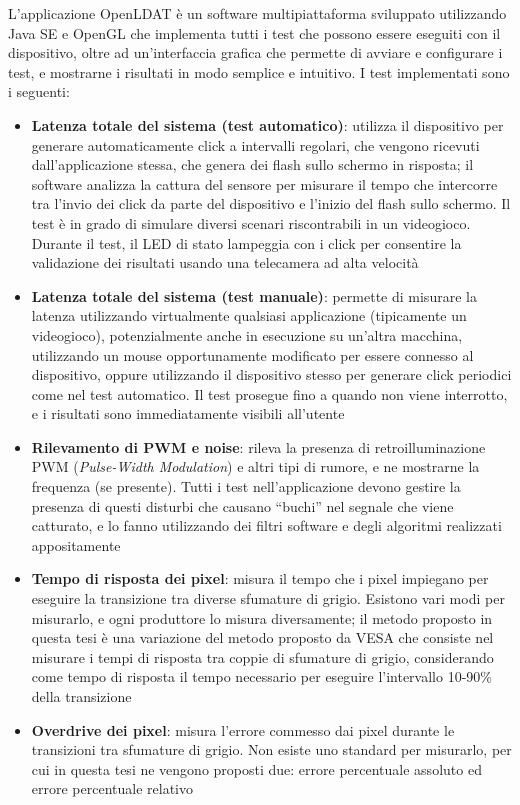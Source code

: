 \documentclass[a4paper]{article}
\begin{document}
L'applicazione OpenLDAT è un software multipiattaforma sviluppato utilizzando Java SE e OpenGL che implementa tutti i test che possono essere eseguiti con il dispositivo, oltre ad un'interfaccia grafica che permette di avviare e configurare i test, e mostrarne i risultati in modo semplice e intuitivo. I test implementati sono i seguenti:\begin{itemize}
	\item \textbf{Latenza totale del sistema (test automatico)}: utilizza il dispositivo per generare automaticamente click a intervalli regolari, che vengono ricevuti dall'applicazione stessa, che genera dei flash sullo schermo in risposta; il software analizza la cattura del sensore per misurare il tempo che intercorre tra l'invio dei click da parte del dispositivo e l'inizio del flash sullo schermo. Il test è in grado di simulare diversi scenari riscontrabili in un videogioco. Durante il test, il LED di stato lampeggia con i click per consentire la validazione dei risultati usando una telecamera ad alta velocità
	\item \textbf{Latenza totale del sistema (test manuale)}: permette di misurare la latenza utilizzando virtualmente qualsiasi applicazione (tipicamente un videogioco), potenzialmente anche in esecuzione su un'altra macchina, utilizzando un mouse opportunamente modificato per essere connesso al dispositivo, oppure utilizzando il dispositivo stesso per generare click periodici come nel test automatico. Il test prosegue fino a quando non viene interrotto, e i risultati sono immediatamente visibili all'utente
	\item \textbf{Rilevamento di PWM e noise}: rileva la presenza di retroilluminazione PWM (\textit{Pulse-Width Modulation}) e altri tipi di rumore, e ne mostrarne la frequenza (se presente). Tutti i test nell'applicazione devono gestire la presenza di questi disturbi che causano ``buchi'' nel segnale che viene catturato, e lo fanno utilizzando dei filtri software e degli algoritmi realizzati appositamente
	\item \textbf{Tempo di risposta dei pixel}: misura il tempo che i pixel impiegano per eseguire la transizione tra diverse sfumature di grigio. Esistono vari modi per misurarlo, e ogni produttore lo misura diversamente; il metodo proposto in questa tesi è una variazione del metodo proposto da VESA che consiste nel misurare i tempi di risposta tra coppie di sfumature di grigio, considerando come tempo di risposta il tempo necessario per eseguire l'intervallo 10-90\% della transizione
	\item \textbf{Overdrive dei pixel}: misura l'errore commesso dai pixel durante le transizioni tra sfumature di grigio. Non esiste uno standard per misurarlo, per cui in questa tesi ne vengono proposti due: errore percentuale assoluto ed errore percentuale relativo

\end{itemize}
\end{document}
